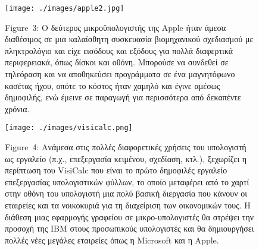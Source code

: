 \documentclass[
]{article}
\begin{document}
\leavevmode{}%
\begin{figure}
\hypertarget{fig:apple2}{%
\centering
\texttt{[image: ./images/apple2.jpg]}
\caption{Figure~3: Ο δεύτερος μικροϋπολογιστής της Apple ήταν άμεσα
διαθέσιμος σε μια καλαίσθητη συσκευασία βιομηχανικού σχεδιασμού με
πληκτρολόγιο και είχε εισόδους και εξόδους για πολλά διαφερτικά
περιφερειακά, όπως δίσκοι και οθόνη. Μπορούσε να συνδεθεί σε τηλεόραση
και να αποθηκεύσει προγράμματα σε ένα μαγνητόφωνο κασέτας ήχου, οπότε το
κόστος ήταν χαμηλό και έγινε αμέσως δημοφιλής, ενώ έμεινε σε παραγωγή
για περισσότερα από δεκαπέντε χρόνια.}\label{fig:apple2}
}
\end{figure}

\leavevmode{}%
\begin{figure}
\hypertarget{fig:visicalc}{%
\centering
\texttt{[image: ./images/visicalc.png]}
\caption{Figure~4: Ανάμεσα στις πολλές διαφορετικές χρήσεις του
υπολογιστή ως εργαλείο (π.χ., επεξεργασία κειμένου, σχεδίαση, κτλ.),
ξεχωρίζει η περίπτωση του VisiCalc που είναι το πρώτο δημοφιλές εργαλείο
επεξεργασίας υπολογιστικών φύλλων, το οποίο μεταφέρει από το χαρτί στην
οθόνη του υπολογιστή μια πολύ βασική διεργασία που κάνουν οι εταιρείες
και τα νοικοκυριά για τη διαχείριση των οικονομικών τους. Η διάθεση μιας
εφαρμογής γραφείου σε μικρο-υπολογιστές θα στρέψει την προσοχή της IBM
στους προσωπικούς υπολογιστές και θα δημιουργήσει πολλές νέες μεγάλες
εταιρείες όπως η Microsoft και η Apple.}\label{fig:visicalc}
}
\end{figure}
\end{document}
